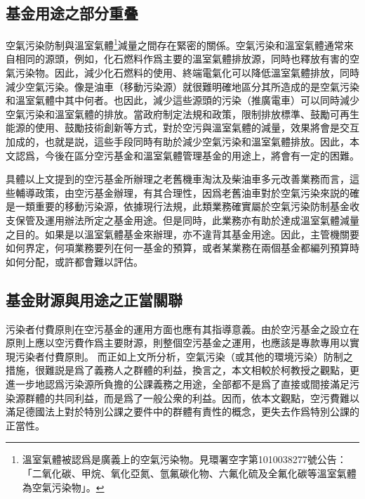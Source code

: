 \documentclass[12pt,a4paper]{article}
\begin{document}
\subsection{基金用途之部分重叠}

空氣污染防制與溫室氣體\footnote{溫室氣體被認爲是廣義上的空氣污染物。見環署空字第1010038277號公告：「二氧化碳、甲烷、氧化亞氮、氫氟碳化物、六氟化硫及全氟化碳等溫室氣體為空氣污染物」。}減量之間存在緊密的關係。空氣污染和溫室氣體通常來自相同的源頭，例如，化石燃料作爲主要的溫室氣體排放源，同時也釋放有害的空氣污染物。因此，減少化石燃料的使用、終端電氣化可以降低溫室氣體排放，同時減少空氣污染。像是油車（移動污染源）就很難明確地區分其所造成的是空氣污染和溫室氣體中其中何者。也因此，減少這些源頭的污染（推廣電車）可以同時減少空氣污染和溫室氣體的排放。當政府制定法規和政策，限制排放標準、鼓勵可再生能源的使用、鼓勵技術創新等方式，對於空污與溫室氣體的減量，效果將會是交互加成的，也就是説，這些手段同時有助於減少空氣污染和溫室氣體排放。因此，本文認爲，今後在區分空污基金和溫室氣體管理基金的用途上，將會有一定的困難。

具體以上文提到的空污基金所辦理之老舊機車淘汰及柴油車多元改善業務而言，這些輔導政策，由空污基金辦理，有其合理性，因爲老舊油車對於空氣污染來説的確是一類重要的移動污染源，依據現行法規，此類業務確實屬於空氣污染防制基金收支保管及運用辦法所定之基金用途。但是同時，此業務亦有助於達成溫室氣體減量之目的。如果是以溫室氣體基金來辦理，亦不違背其基金用途。因此，主管機關要如何界定，何項業務要列在何一基金的預算，或者某業務在兩個基金都編列預算時如何分配，或許都會難以評估。

\subsection{基金財源與用途之正當關聯}

污染者付費原則在空污基金的運用方面也應有其指導意義。由於空污基金之設立在原則上應以空污費作爲主要財源，則整個空污基金之運用，也應該是專款專用以實現污染者付費原則。
而正如上文所分析，空氣污染（或其他的環境污染）防制之措施，很難説是爲了義務人之群體的利益，換言之，本文相較於柯教授之觀點，更進一步地認爲污染源所負擔的公課義務之用途，全部都不是爲了直接或間接滿足污染源群體的共同利益，而是爲了一般公衆的利益。因而，依本文觀點，空污費難以滿足德國法上對於特別公課之要件中的群體有責性的概念，更失去作爲特別公課的正當性。
\end{document}

